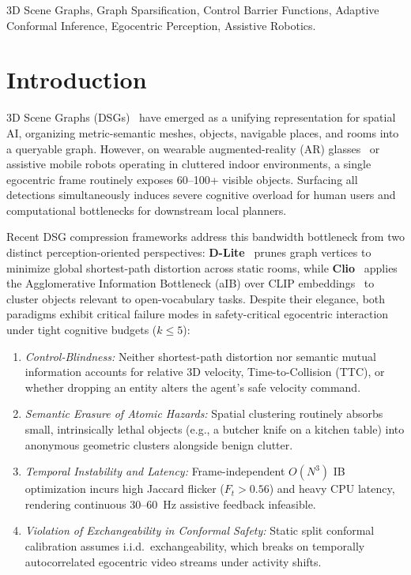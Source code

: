 \documentclass[journal]{IEEEtran}
\begin{document}
\begin{IEEEkeywords}
3D Scene Graphs, Graph Sparsification, Control Barrier Functions, Adaptive Conformal Inference, Egocentric Perception, Assistive Robotics.
\end{IEEEkeywords}

\section{Introduction}
 3D Scene Graphs (DSGs)~\cite{hughes2022hydra,hughes2024hydra_ijrr} have emerged as a unifying representation for spatial AI, organizing metric-semantic meshes, objects, navigable places, and rooms into a queryable graph. However, on wearable augmented-reality (AR) glasses~\cite{pan2023adt} or assistive mobile robots operating in cluttered indoor environments, a single egocentric frame routinely exposes 60--100+ visible objects. Surfacing all detections simultaneously induces severe cognitive overload for human users and computational bottlenecks for downstream local planners.

Recent DSG compression frameworks address this bandwidth bottleneck from two distinct perception-oriented perspectives: \textbf{D-Lite}~\cite{maggio2024dlite} prunes graph vertices to minimize global shortest-path distortion across static rooms, while \textbf{Clio}~\cite{maggio2024clio} applies the Agglomerative Information Bottleneck (aIB) over CLIP embeddings~\cite{radford2021clip} to cluster objects relevant to open-vocabulary tasks. Despite their elegance, both paradigms exhibit critical failure modes in safety-critical egocentric interaction under tight cognitive budgets ($k \le 5$):
\begin{enumerate}
    \item \emph{Control-Blindness:} Neither shortest-path distortion nor semantic mutual information accounts for relative 3D velocity, Time-to-Collision (TTC), or whether dropping an entity alters the agent's safe velocity command.
    \item \emph{Semantic Erasure of Atomic Hazards:} Spatial clustering routinely absorbs small, intrinsically lethal objects (e.g., a butcher knife on a kitchen table) into anonymous geometric clusters alongside benign clutter.
    \item \emph{Temporal Instability and Latency:} Frame-independent $O(N^3)$ IB optimization incurs high Jaccard flicker ($F_t > 0.56$) and heavy CPU latency, rendering continuous 30--60~Hz assistive feedback infeasible.
    \item \emph{Violation of Exchangeability in Conformal Safety:} Static split conformal calibration assumes i.i.d.\ exchangeability, which breaks on temporally autocorrelated egocentric video streams under activity shifts.
\end{enumerate}
\end{document}
